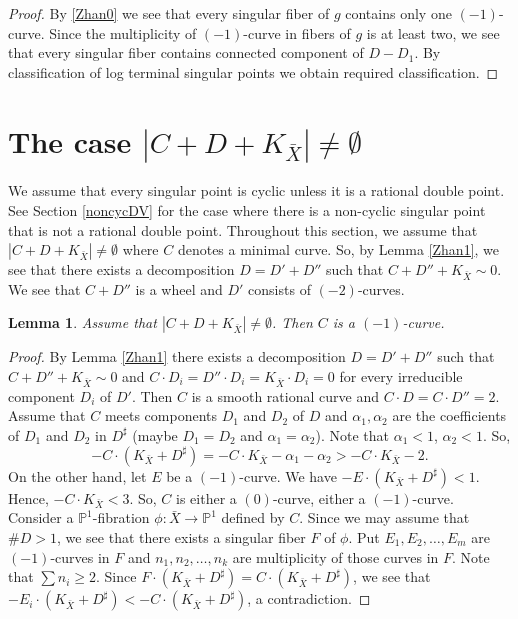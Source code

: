 \documentclass[10pt,oneside,reqno]{amsart}
\newcommand{\pp}{\mathbb{P}}
\newtheorem{lemma}[theorem]{Lemma}
\theoremstyle{definition}
\theoremstyle{remark}
\numberwithin{equation}{section}
\begin{document}
\begin{proof}
By \ref{Zhan0} we see that every singular fiber of $g$ contains only one $(-1)$-curve. Since the multiplicity of $(-1)$-curve in fibers of $g$ is at least two, we see that every singular fiber contains connected component of $D-D_1$. By classification of log terminal singular points we obtain required classification.
\end{proof}



\section{The case $|C+D+K_{\bar{X}}|\neq\emptyset$}\label{NoEmpty}
We assume that every singular point is cyclic unless it is a rational double point. See Section \ref{noncycDV} for the case where there is a non-cyclic singular point that is not a rational double point. Throughout this section, we assume that $|C+D+K_{\bar{X}}|\neq\emptyset$ where $C$ denotes a minimal curve. So, by Lemma \ref{Zhan1}, we see that there exists a decomposition $D=D'+D''$ such that $C+D''+K_{\bar{X}}\sim 0$. We see that $C+D''$ is a wheel and $D'$ consists of $(-2)$-curves.


\begin{lemma}
\label{C(-1)curve}
Assume that $|C+D+K_{\bar{X}}|\neq\emptyset$. Then $C$ is a $(-1)$-curve.
\end{lemma}

\begin{proof}
By Lemma \ref{Zhan1} there exists a decomposition $D=D'+D''$ such that $C+D''+K_{\bar{X}}\sim 0$ and $C\cdot D_i=D''\cdot D_i=K_{\bar{X}}\cdot D_i=0$ for every irreducible component $D_i$ of $D'$. Then $C$ is a smooth rational curve and $C\cdot D=C\cdot D''=2$. Assume that $C$ meets components $D_1$ and $D_2$ of $D$ and $\alpha_1,\alpha_2$ are the coefficients of $D_1$ and $D_2$ in $D^{\sharp}$ (maybe $D_1=D_2$ and $\alpha_1=\alpha_2$). Note that $\alpha_1<1$, $\alpha_2<1$. So, $$-C\cdot(K_{\bar{X}}+D^{\sharp})=-C\cdot K_{\bar{X}}-\alpha_1-\alpha_2>-C\cdot K_{\bar{X}}-2.$$ On the other hand, let $E$ be a $(-1)$-curve. We have $-E\cdot(K_{\bar{X}}+D^{\sharp})<1$. Hence, $-C\cdot K_{\bar{X}}<3$. So, $C$ is either a $(0)$-curve, either a $(-1)$-curve. Consider a $\pp^1$-fibration $\phi\colon\bar{X}\rightarrow\pp^1$ defined by $C$. Since we may assume that $\#D>1$, we see that there exists a singular fiber $F$ of $\phi$. Put $E_1,E_2,\ldots, E_m$ are $(-1)$-curves in $F$ and $n_1,n_2,\ldots,n_k$ are multiplicity of those curves in $F$. Note that $\sum n_i\geq 2$. Since $F\cdot(K_{\bar{X}}+D^{\sharp})=C\cdot(K_{\bar{X}}+D^{\sharp})$, we see that $-E_i\cdot(K_{\bar{X}}+D^{\sharp})<-C\cdot(K_{\bar{X}}+D^{\sharp})$, a contradiction.
\end{proof}
\end{document}
